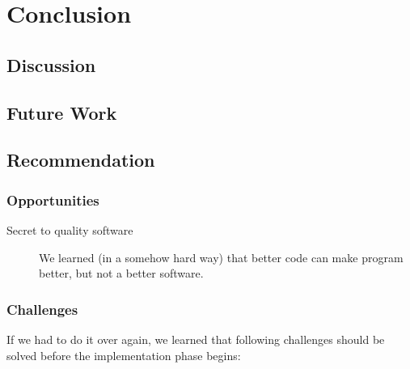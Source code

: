%
%
\chapter{Conclusion}

\section{Discussion}

\section{Future Work}

\section{Recommendation}

\subsection{Opportunities}


\begin{description}
	\item[Secret to quality software] We learned (in a somehow hard way) that better code can make program better, but not a better software. %
\end{description}

\subsection{Challenges}

If we had to do it over again, we learned that following challenges should be solved before the implementation phase begins:

